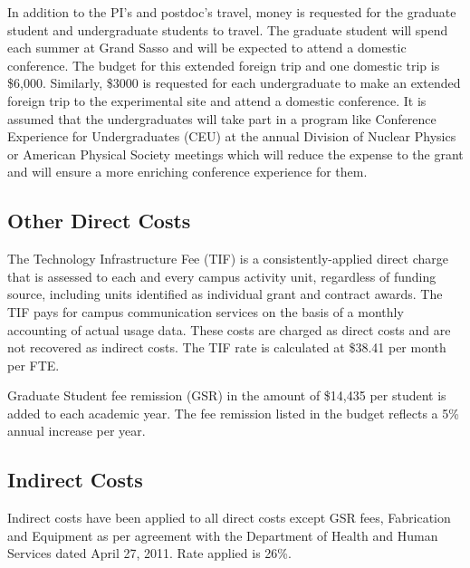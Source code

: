 In addition to the PI's and postdoc's travel, money is requested for the graduate student and undergraduate students to travel. The graduate student will spend each summer at Grand Sasso and will be expected to attend a domestic conference. The budget for this extended foreign trip and one domestic trip is \$6,000.  Similarly, \$3000 is requested for each undergraduate to make an extended foreign trip to the experimental site and attend a domestic conference. It is assumed that the undergraduates will take part in a program like Conference Experience for Undergraduates (CEU) at the annual Division of Nuclear Physics or American Physical Society meetings which will reduce the expense to the grant and will ensure a more enriching conference experience for them.


\subsection{Other Direct Costs}

The Technology Infrastructure Fee (TIF) is a consistently-applied direct charge that is assessed to each and every campus activity unit, regardless of funding source, including units identified as individual grant and contract awards. The TIF pays for campus communication services on the basis of a monthly accounting of actual usage data. These costs are charged as direct costs and are not recovered as indirect costs. The TIF rate is calculated at \$38.41 per month per FTE.

Graduate Student fee remission (GSR) in the amount of \$14,435 per student is added to each academic year. The fee remission listed in the budget reflects a 5\% annual increase per year.

\subsection{Indirect Costs}

Indirect costs have been applied to all direct costs except GSR fees, Fabrication and Equipment as per agreement with the Department of Health and Human Services dated April 27, 2011.  	      Rate applied is 26\%.
